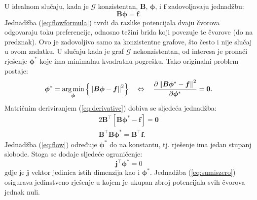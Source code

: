 \documentclass[lmodern, utf8, diplomski, numeric]{fer}
\newcommand{\matr}[1]{\mathbold{#1}}
\newcommand{\graph}[1]{\mathcal{#1}}
\newcommand{\T}{\top}
\DeclareMathOperator*{\argmin}{arg\min}
\begin{document}
  U idealnom slučaju, kada je $\graph{G}$ konzistentan, $\matr{B}$, $\matr{\phi}$, i $\matr{f}$ zadovoljavaju jednadžbu:
  \begin{equation}
  \label{eq:flowformula}
  \matr{B} \matr{\phi} = \matr{f}.
  \end{equation}
  Jednadžba (\ref{eq:flowformula}) tvrdi da razlike potencijala dvaju čvorova odgovaraju toku preferencije, odnosno težini brida koji povezuje te čvorove (do na predznak).
  Ovo je zadovoljivo samo za konzistentne grafove, što često i nije slučaj u ovom zadatku.
  U slučaju kada je graf $\graph{G}$ nekonzistentan, od interesa je pronaći rješenje $\matr{\phi^*}$ koje ima minimalnu kvadratnu pogrešku.
  Tako originalni problem postaje:
  \begin{gather}
  \label{eq:derivative}
  \matr{\phi^*} = \argmin_{\matr{\phi}} \left\{ \left \lVert \matr{B} \matr{\phi} - \matr{f}\textsl{} \right \rVert ^ 2 \right\} \quad
  \Leftrightarrow \quad 
  \frac{\partial \left \lVert \matr{B} \matr{\phi^*} - \matr{f} \right \rVert ^ 2}{\partial \matr{\phi^*}} = \mathbf{0}.
  \end{gather}
  Matričnim deriviranjem (\ref{eq:derivative}) dobiva se sljedeća jednadžba:
  \begin{gather}
  2 \matr{B}^\T \left[\matr{B} \matr{\phi^*} - \matr{f} \right] = \mathbf{0} \nonumber \\
  \label{eq:flow}
  \matr{B}^\T \matr{B} \matr{\phi^*} = \matr{B}^\T \matr{f}.
  \end{gather}
  Jednadžba (\ref{eq:flow}) određuje $\matr{\phi^*}$ do na konstantu, tj. rješenje ima jedan stupanj slobode.
  Stoga se dodaje sljedeće ograničenje:
  \begin{equation}
  \label{eq:sumiszero}
  \matr{j}^\T \matr{\phi^*} = 0
  \end{equation}
  gdje je $\matr{j}$ vektor jedinica istih dimenzija kao i $\matr{\phi^*}$.
  Jednadžba (\ref{eq:sumiszero}) osigurava jedinstveno rješenje u kojem je ukupan zbroj potencijala svih čvorova jednak nuli.
  
\end{document}
